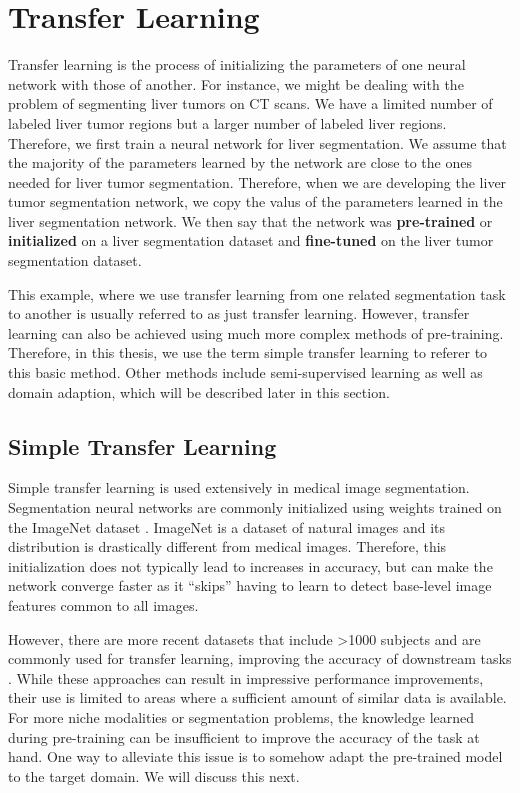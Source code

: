 \section{Transfer Learning}

Transfer learning is the process of initializing the parameters of one neural network with those of another. For instance, we might be dealing with the problem of segmenting liver tumors on CT scans. We have a limited number of labeled liver tumor regions but a larger number of labeled liver regions. Therefore, we first train a neural network for liver segmentation. We assume that the majority of the parameters learned by the network are close to the ones needed for liver tumor segmentation. Therefore, when we are developing the liver tumor segmentation network, we copy the valus of the parameters learned in the liver segmentation network. We then say that the network was \textbf{pre-trained} or \textbf{initialized} on a liver segmentation dataset and \textbf{fine-tuned} on the liver tumor segmentation dataset.

This example, where we use transfer learning from one related segmentation task to another is usually referred to as just transfer learning. However, transfer learning can also be achieved using much more complex methods of pre-training. Therefore, in this thesis, we use the term simple transfer learning to referer to this basic method. Other methods include semi-supervised learning as well as domain adaption, which will be described later in this section.

	\subsection{Simple Transfer Learning}
	
Simple transfer learning is used extensively in medical image segmentation. Segmentation neural networks are commonly initialized using weights trained on the ImageNet dataset . ImageNet is a dataset of natural images and its distribution is drastically different from medical images. Therefore, this initialization does not typically lead to increases in accuracy, but can make the network converge faster as it ``skips'' having to learn to detect base-level image features common to all images.


However, there are more recent datasets \cite{wasserthalTotalSegmentatorRobustSegmentation2023} that include >1000 subjects and are commonly used for transfer learning, improving the accuracy of downstream tasks \cite{monaiconsortiumMONAIMedicalOpen2023, myronenkoAutomated3DSegmentation2023}. While these approaches can result in impressive performance improvements, their use is limited to areas where a sufficient amount of similar data is available. For more niche modalities or segmentation problems, the knowledge learned during pre-training can be insufficient to improve the accuracy of the task at hand. One way to alleviate this issue is to somehow adapt the pre-trained model to the target domain. We will discuss this next.

